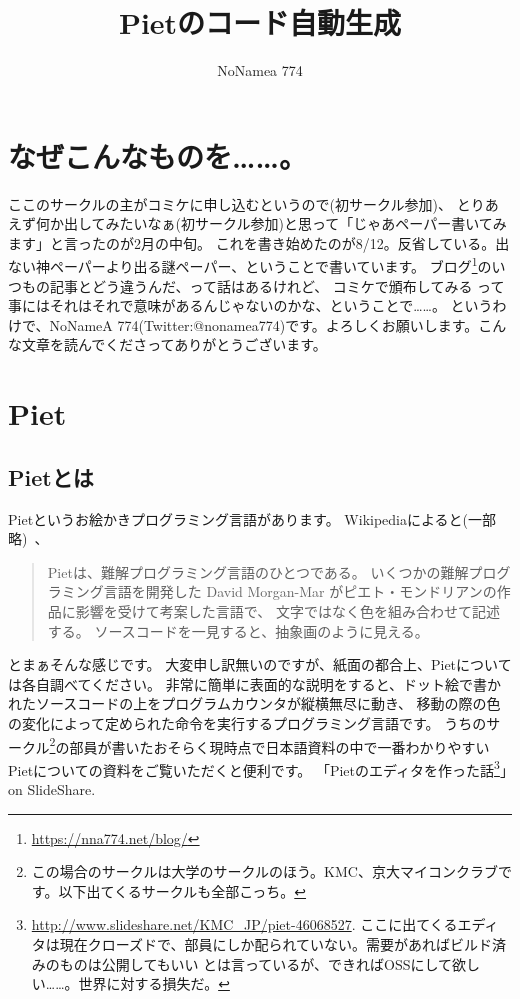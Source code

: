 \documentclass[twocolumn,8pt,b5paper]{extarticle}
\title{Pietのコード自動生成}
\author{NoNamea 774}
\begin{document}
\maketitle

\section{なぜこんなものを……。}
ここのサークルの主がコミケに申し込むというので(初サークル参加)、
とりあえず何か出してみたいなぁ(初サークル参加)と思って「じゃあペーパー書いてみます」と言ったのが2月の中旬。
これを書き始めたのが8/12。反省している。出ない神ペーパーより出る謎ペーパー、ということで書いています。
ブログ\footnote{\url{https://nna774.net/blog/}}のいつもの記事とどう違うんだ、って話はあるけれど、
コミケで頒布してみる って事にはそれはそれで意味があるんじゃないのかな、ということで……。
というわけで、NoNameA 774(Twitter:@nonamea774)です。よろしくお願いします。こんな文章を読んでくださってありがとうございます。

\section{Piet}
\subsection{Pietとは}
Pietというお絵かきプログラミング言語があります。
Wikipediaによると(一部略)~\cite{wppiet}、
\begin{quotation}
Pietは、難解プログラミング言語のひとつである。
いくつかの難解プログラミング言語を開発した David Morgan-Mar がピエト・モンドリアンの作品に影響を受けて考案した言語で、
文字ではなく色を組み合わせて記述する。 ソースコードを一見すると、抽象画のように見える。
\end{quotation}
とまぁそんな感じです。
大変申し訳無いのですが、紙面の都合上、Pietについては各自調べてください。
非常に簡単に表面的な説明をすると、ドット絵で書かれたソースコードの上をプログラムカウンタが縦横無尽に動き、
移動の際の色の変化によって定められた命令を実行するプログラミング言語です。
うちのサークル\footnote{この場合のサークルは大学のサークルのほう。KMC、京大マイコンクラブです。以下出てくるサークルも全部こっち。}の部員が書いたおそらく現時点で日本語資料の中で一番わかりやすいPietについての資料をご覧いただくと便利です。
「Pietのエディタを作った話\footnote{\url{http://www.slideshare.net/KMC_JP/piet-46068527}. ここに出てくるエディタは現在クローズドで、部員にしか配られていない。需要があればビルド済みのものは公開してもいい とは言っているが、できればOSSにして欲しい……。世界に対する損失だ。}」on SlideShare.
\end{document}
